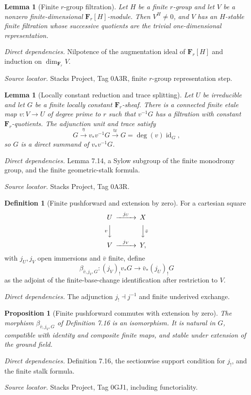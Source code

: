 \documentclass[10pt]{article}
\newtheorem{proposition}[theorem]{Proposition}
\newtheorem{lemma}[theorem]{Lemma}
\theoremstyle{definition}
\newtheorem{definition}[theorem]{Definition}
\newcommand{\F}{\mathbf F}
\newcommand{\deps}[1]{\par\smallskip\textit{Direct dependencies.} #1\par}
\newcommand{\sources}[1]{\par\textit{Source locator.} #1\par}
\begin{document}
\begin{lemma}[Finite $r$-group filtration]
Let $H$ be a finite $r$-group and let $V$ be a nonzero finite-dimensional
$\F_r[H]$-module.  Then $V^H\neq0$, and $V$ has an $H$-stable finite
filtration whose successive quotients are the trivial one-dimensional
representation.
\end{lemma}
\deps{Nilpotence of the augmentation ideal of $\F_r[H]$ and induction on
$\dim_{\F_r}V$.}
\sources{Stacks Project, Tag 0A3R, finite $r$-group representation step.}

\begin{lemma}[Locally constant reduction and trace splitting]
Let $U$ be irreducible and let $G$ be a finite locally constant
$\F_r$-sheaf.  There is a connected finite etale map $v:V\to U$ of degree
prime to $r$ such that $v^{-1}G$ has a filtration with constant
$\F_r$-quotients.  The adjunction unit and trace satisfy
\[
 G\xrightarrow{\eta}v_*v^{-1}G
 \xrightarrow{\operatorname{tr}}G
   =\deg(v)\operatorname{id}_G,
\]
so $G$ is a direct summand of $v_*v^{-1}G$.
\end{lemma}
\deps{Lemma 7.14, a Sylow subgroup of the finite monodromy group, and the
finite geometric-stalk formula.}
\sources{Stacks Project, Tag 0A3R.}

\begin{definition}[Finite pushforward and extension by zero]
For a cartesian square
\[
\begin{CD}
 U @>{j_U}>> X\\
 @V{v}VV @VV{\bar v}V\\
 V @>{j_V}>> Y,
\end{CD}
\]
with $j_U,j_V$ open immersions and $\bar v$ finite, define
\[
 \beta_{\bar v,j_V,G}:(j_V)_!v_*G
 \longrightarrow\bar v_*(j_U)_!G
\]
as the adjoint of the finite-base-change identification after restriction
to $V$.
\end{definition}
\deps{The adjunction $j_!\dashv j^{-1}$ and finite underived exchange.}

\begin{proposition}[Finite pushforward commutes with extension by zero]
The morphism $\beta_{\bar v,j_V,G}$ of Definition 7.16 is an isomorphism.
It is natural in $G$, compatible with identity and composite finite maps,
and stable under extension of the ground field.
\end{proposition}
\deps{Definition 7.16, the sectionwise support condition for $j_!$, and the
finite stalk formula.}
\sources{Stacks Project, Tag 0GJ1, including functoriality.}
\end{document}
